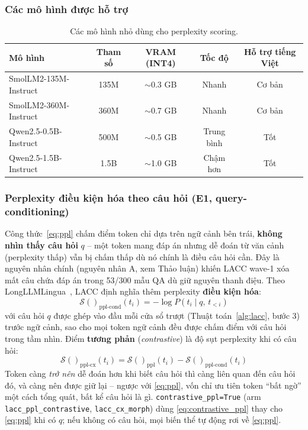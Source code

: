 \documentclass[12pt,a4paper]{article}
\newcommand{\score}[1]{\mathcal{S}(#1)}      %
\newcommand{\method}[1]{\textsc{#1}}         %
\begin{document}
\subsubsection{Các mô hình được hỗ trợ}

\begin{table}[H]
\centering
\caption{Các mô hình nhỏ dùng cho perplexity scoring.}
\label{tab:tiny_models}
\begin{tabular}{lcccc}
\toprule
\textbf{Mô hình} & \textbf{Tham số} & \textbf{VRAM (INT4)} & \textbf{Tốc độ} & \textbf{Hỗ trợ tiếng Việt} \\
\midrule
SmolLM2-135M-Instruct & 135M & $\sim$0.3 GB & Nhanh & Cơ bản \\
SmolLM2-360M-Instruct & 360M & $\sim$0.7 GB & Nhanh & Cơ bản \\
Qwen2.5-0.5B-Instruct & 500M & $\sim$0.5 GB & Trung bình & Tốt \\
Qwen2.5-1.5B-Instruct & 1.5B & $\sim$1.0 GB & Chậm hơn & Tốt \\
\bottomrule
\end{tabular}
\end{table}

\subsubsection{Perplexity điều kiện hóa theo câu hỏi (E1, query-conditioning)}
\label{sec:query_conditioning}

Công thức~\eqref{eq:ppl} chấm điểm token chỉ dựa trên ngữ cảnh bên trái, \textbf{không nhìn thấy câu hỏi} $q$ -- một token mang đáp án nhưng dễ đoán từ văn cảnh (perplexity thấp) vẫn bị chấm thấp dù nó chính là điều câu hỏi cần. Đây là nguyên nhân chính (nguyên nhân A, xem Thảo luận) khiến \method{LACC} wave-1 xóa mất câu chứa đáp án trong 53/300 mẫu QA dù giữ nguyên thanh điệu. Theo LongLLMLingua~\cite{jiang2023longllmlingua}, \method{LACC} định nghĩa thêm perplexity \textbf{điều kiện hóa}:
\begin{equation}\label{eq:cond_ppl}
    \score{}_{\text{ppl-cond}}(t_i) = -\log P(t_i \mid q,\, t_{<i})
\end{equation}
với câu hỏi $q$ được ghép vào đầu mỗi cửa sổ trượt (Thuật toán~\ref{alg:lacc}, bước 3) trước ngữ cảnh, sao cho mọi token ngữ cảnh đều được chấm điểm với câu hỏi trong tầm nhìn. Điểm \textbf{tương phản} (\textit{contrastive}) là độ sụt perplexity khi có câu hỏi:
\begin{equation}\label{eq:contrastive_ppl}
    \score{}_{\text{ppl-cx}}(t_i) = \score{}_{\text{ppl}}(t_i) - \score{}_{\text{ppl-cond}}(t_i)
\end{equation}
Token càng \textit{trở nên} dễ đoán hơn khi biết câu hỏi thì càng liên quan đến câu hỏi đó, và càng nên được giữ lại -- ngược với \eqref{eq:ppl}, vốn chỉ ưu tiên token ``bất ngờ'' một cách tổng quát, bất kể câu hỏi là gì. \texttt{contrastive\_ppl=True} (arm \texttt{lacc\_ppl\_contrastive}, \texttt{lacc\_cx\_morph}) dùng \eqref{eq:contrastive_ppl} thay cho \eqref{eq:ppl} khi có $q$; nếu không có câu hỏi, mọi biến thể tự động rơi về \eqref{eq:ppl}.
\end{document}
